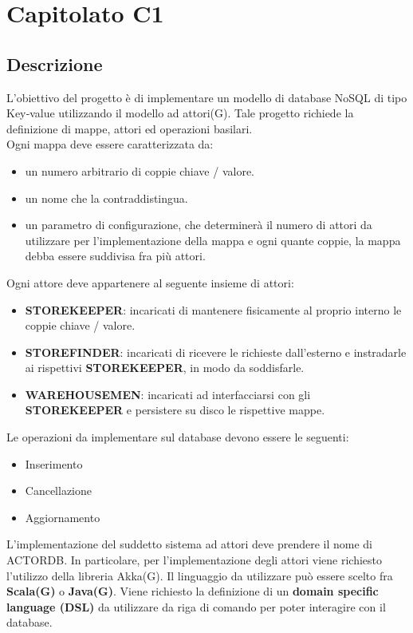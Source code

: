 \section{Capitolato C1}
\subsection{Descrizione}
L'obiettivo del progetto è di implementare un modello di database NoSQL di tipo Key‐value utilizzando il modello ad attori(G).
Tale progetto richiede la definizione di mappe, attori ed operazioni basilari. 
\\Ogni mappa deve essere caratterizzata da:
\begin{itemize}
\item
un numero arbitrario di coppie chiave / valore. 
\item 
un nome che la contraddistingua. 
\item
un parametro di configurazione, che determinerà il numero di attori da utilizzare per l'implementazione della mappa e ogni quante coppie, la mappa debba essere suddivisa fra più attori.
\end{itemize}
Ogni attore deve appartenere al seguente insieme di attori:
\begin{itemize}
\item
\textbf{STOREKEEPER}: incaricati di mantenere fisicamente al proprio interno le coppie chiave / valore.
\item
\textbf{STOREFINDER}: incaricati di ricevere le richieste dall’esterno e instradarle ai 
rispettivi \textbf{STOREKEEPER}, in modo da soddisfarle. 
\item
\textbf{WAREHOUSEMEN}: incaricati ad interfacciarsi con gli \textbf{STOREKEEPER} e persistere su disco le rispettive mappe.
\end{itemize}

Le operazioni da implementare sul database devono essere le seguenti: 
\begin{itemize}
\item
Inserimento
\item
Cancellazione 
\item
Aggiornamento 
\end{itemize}

L'implementazione del suddetto sistema ad attori deve prendere il nome di ACTORDB. In particolare, per l'implementazione degli attori viene richiesto l'utilizzo della libreria Akka(G).
Il linguaggio da utilizzare può essere scelto fra \textbf{Scala(G)} o \textbf{Java(G)}. 
Viene richiesto la definizione di un \textbf{domain specific language (DSL)} da utilizzare da riga di comando per poter interagire con il database.

